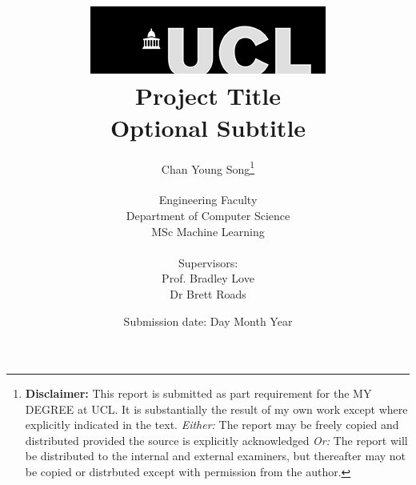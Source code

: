 \title{
    {\includegraphics[scale=.5]{imgs/ucl_logo.png}}\\
    {{\Huge Project Title}}\\
    {\large Optional Subtitle}\\
}
\date{Submission date: Day Month Year}

\author{
    Chan Young Song\thanks{
        {\bf Disclaimer:}
        This report is submitted as part requirement for the MY DEGREE at UCL. It is
        substantially the result of my own work except where explicitly indicated in the text.
        \emph{Either:} The report may be freely copied and distributed provided the source is explicitly acknowledged
        \newline  %
        \emph{Or:}\newline
        The report will be distributed to the internal and external examiners, but thereafter may not be copied or distrbuted except with permission from the author.
    }
    \\ \\
    Engineering Faculty\\
    Department of Computer Science\\
    MSc Machine Learning\\ \\
    Supervisors:\\
    Prof. Bradley Love\\
    Dr Brett Roads
}